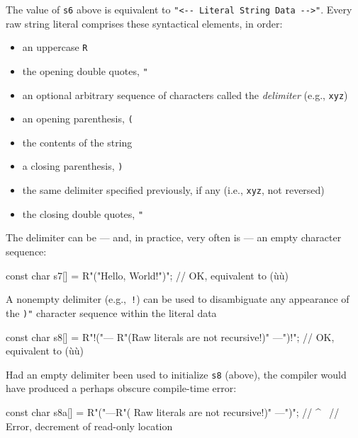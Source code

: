 The value of \lstinline!s6! above is equivalent to
\lstinline!"<--!~\lstinline!Literal!~\lstinline!String!~\lstinline!Data!~\lstinline!-->"!.
Every raw string literal comprises these syntactical elements, in order:
\begin{itemize}
\item{an uppercase \lstinline!R!}
\item{the opening double quotes, \lstinline!"!}
\item{an optional arbitrary sequence of characters called the \emph{delimiter} (e.g., \lstinline!xyz!)}
\item{an opening parenthesis, \lstinline!(!}
\item{the contents of the string}
\item{a closing parenthesis, \lstinline!)!}
\item{the same delimiter specified previously, if any (i.e., \lstinline!xyz!, not reversed)}
\item{the closing double quotes, \lstinline!"!}
\end{itemize}

The delimiter can be --- and, in practice, very often is --- an empty character
sequence:

\begin{emcppslisting}
const char s7[] = R"("Hello, World!")";
    // OK, equivalent to (ù{}ù)
\end{emcppslisting}

\noindent A nonempty delimiter (e.g.,~\lstinline|!|) can be used to disambiguate any
appearance of the \lstinline!)"! character sequence within the literal data

\begin{emcppslisting}
const char s8[] = R"!("--- R"(Raw literals are not recursive!)" ---")!";
    // OK, equivalent to (ù{}ù)
\end{emcppslisting}

\noindent Had an empty delimiter been used to initialize \lstinline!s8! (above), the
compiler would have produced a perhaps obscure compile-time error:

%
\begin{emcppslisting}[emcppserrorlines={1}]
const char s8a[] = R"("---R"( Raw literals are not recursive!)" ---")";
    //                                                            ^~
    // Error, decrement of read-only location
\end{emcppslisting}

